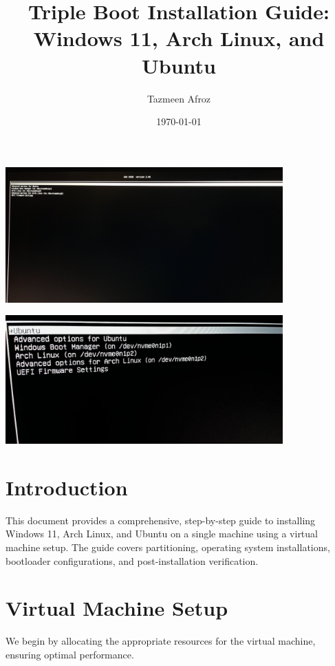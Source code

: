 \documentclass[a4paper]{article}
\title{\textcolor{titlecolor}{\textbf{Triple Boot Installation Guide: Windows 11, Arch Linux, and Ubuntu}}}
\author{Tazmeen Afroz}
\date{\today}
\begin{document}
\maketitle
\begin{center}
    \includegraphics[width=0.8\textwidth]{0.jpeg} %
\end{center}
\begin{center}
    \includegraphics[width=0.8\textwidth]{1.jpeg} %
\end{center}


\newpage
\tableofcontents
\newpage

\section{Introduction}
This document provides a comprehensive, step-by-step guide to installing Windows 11, Arch Linux, and Ubuntu on a single machine using a virtual machine setup. The guide covers partitioning, operating system installations, bootloader configurations, and post-installation verification.

\section{Virtual Machine Setup}
We begin by allocating the appropriate resources for the virtual machine, ensuring optimal performance.
\end{document}
